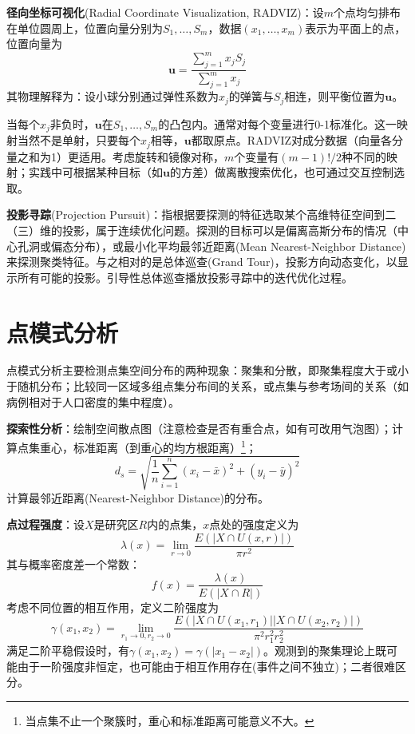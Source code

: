 \par \textbf{径向坐标可视化}(Radial Coordinate Visualization, RADVIZ)：设$m$个点均匀排布在单位圆周上，位置向量分别为$S_1,\dots,S_m$，数据$(x_1,\dots,x_m)$表示为平面上的点，位置向量为
\begin{equation}
    \mathbf{u}=\frac{\sum_{j=1}^m x_j S_j}{\sum_{j=1}^m x_j}
\end{equation}
其物理解释为：设小球分别通过弹性系数为$x_j$的弹簧与$S_j$相连，则平衡位置为$\mathbf{u}$。

\par 当每个$x_j$非负时，$\mathbf{u}$在$S_1,\dots,S_m$的凸包内。通常对每个变量进行0-1标准化。这一映射当然不是单射，只要每个$x_j$相等，$\mathbf{u}$都取原点。RADVIZ对成分数据（向量各分量之和为1）更适用。考虑旋转和镜像对称，$m$个变量有$(m-1)!/2$种不同的映射；实践中可根据某种目标（如$\mathbf{u}$的方差）做离散搜索优化，也可通过交互控制选取。

\par \textbf{投影寻踪}(Projection Pursuit)：指根据要探测的特征选取某个高维特征空间到二（三）维的投影，属于连续优化问题。探测的目标可以是偏离高斯分布的情况（中心孔洞或偏态分布），或最小化平均最邻近距离(Mean Nearest-Neighbor Distance)来探测聚类特征。与之相对的是总体巡查(Grand Tour)，投影方向动态变化，以显示所有可能的投影。引导性总体巡查播放投影寻踪中的迭代优化过程。

\section{点模式分析}
\par 点模式分析主要检测点集空间分布的两种现象：聚集和分散，即聚集程度大于或小于随机分布；比较同一区域多组点集分布间的关系，或点集与参考场间的关系（如病例相对于人口密度的集中程度）。

\par \textbf{探索性分析}：绘制空间散点图（注意检查是否有重合点，如有可改用气泡图）；计算点集重心，标准距离（到重心的均方根距离）\footnote{当点集不止一个聚簇时，重心和标准距离可能意义不大。}；
\begin{equation}
    d_s = \sqrt{\frac{1}{n}\sum_{i=1}^n (x_i-\bar{x})^2+(y_i-\bar{y})^2}
\end{equation}
计算最邻近距离(Nearest-Neighbor Distance)的分布。

\par \textbf{点过程强度}：设$X$是研究区$R$内的点集，$x$点处的强度定义为
\begin{equation*}
    \lambda(x)=\lim\limits_{r\to 0}\frac{E(\vert X\cap U(x,r) \vert)}{\pi r^2}
\end{equation*}
其与概率密度差一个常数：
\begin{equation}
    f(x)=\frac{\lambda(x)}{E(\vert X\cap R \vert)}
\end{equation}
考虑不同位置的相互作用，定义二阶强度为
\begin{equation*}
\gamma(x_1,x_2)=\lim\limits_{r_1\to 0,r_2\to 0}\frac{E(\vert X\cap U(x_1,r_1) \vert\vert X\cap U(x_2,r_2) \vert)}{\pi^2 r_1^2r_2^2}
\end{equation*}
满足二阶平稳假设时，有$\gamma(x_1,x_2)=\gamma(\vert x_1-x_2 \vert)$。观测到的聚集理论上既可能由于一阶强度非恒定，也可能由于相互作用存在(事件之间不独立)；二者很难区分。

